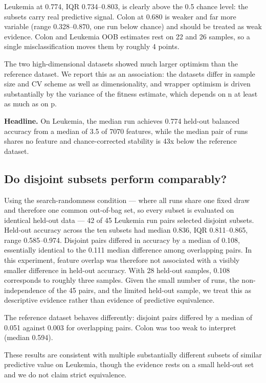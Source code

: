 \documentclass[conference]{IEEEtran}
\begin{document}
Leukemia at 0.774, IQR 0.734--0.803, is clearly above the 0.5 chance level: the subsets carry real predictive signal. Colon at 0.680 is weaker and far more variable (range 0.328--0.870, one run below chance) and should be treated as weak evidence. Colon and Leukemia OOB estimates rest on 22 and 26 samples, so a single misclassification moves them by roughly 4 points.

The two high-dimensional datasets showed much larger optimism than the reference dataset. We report this as an association: the datasets differ in sample size and CV scheme as well as dimensionality, and wrapper optimism is driven substantially by the variance of the fitness estimate, which depends on n at least as much as on p.

\textbf{Headline.} On Leukemia, the median run achieves 0.774 held-out balanced accuracy from a median of 3.5 of 7070 features, while the median pair of runs shares no feature and chance-corrected stability is 43x below the reference dataset.

\subsection{Do disjoint subsets perform comparably?}

Using the search-randomness condition --- where all runs share one fixed draw and therefore one common out-of-bag set, so every subset is evaluated on identical held-out data --- 42 of 45 Leukemia run pairs selected disjoint subsets. Held-out accuracy across the ten subsets had median 0.836, IQR 0.811--0.865, range 0.585--0.974. Disjoint pairs differed in accuracy by a median of 0.108, essentially identical to the 0.111 median difference among overlapping pairs. In this experiment, feature overlap was therefore not associated with a visibly smaller difference in held-out accuracy. With 28 held-out samples, 0.108 corresponds to roughly three samples. Given the small number of runs, the non-independence of the 45 pairs, and the limited held-out sample, we treat this as descriptive evidence rather than evidence of predictive equivalence.

The reference dataset behaves differently: disjoint pairs differed by a median of 0.051 against 0.003 for overlapping pairs. Colon was too weak to interpret (median 0.594).

These results are consistent with multiple substantially different subsets of similar predictive value on Leukemia, though the evidence rests on a small held-out set and we do not claim strict equivalence.
\end{document}
